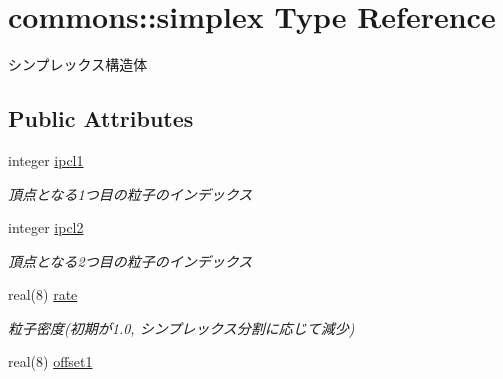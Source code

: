 \hypertarget{structcommons_1_1simplex}{\section{commons\-:\-:simplex Type Reference}
\label{structcommons_1_1simplex}
}


シンプレックス構造体  


\subsection*{Public Attributes}
\begin{DoxyCompactItemize}
\item 
\hypertarget{structcommons_1_1simplex_ac342ada7e0a8ad8c324434b3a5763ec3}{integer \hyperlink{structcommons_1_1simplex_ac342ada7e0a8ad8c324434b3a5763ec3}{ipcl1}}\label{structcommons_1_1simplex_ac342ada7e0a8ad8c324434b3a5763ec3}

\begin{DoxyCompactList}\small\item\em 頂点となる1つ目の粒子のインデックス \end{DoxyCompactList}\item 
\hypertarget{structcommons_1_1simplex_a220193df1706ae8c3323d72c83f8ca42}{integer \hyperlink{structcommons_1_1simplex_a220193df1706ae8c3323d72c83f8ca42}{ipcl2}}\label{structcommons_1_1simplex_a220193df1706ae8c3323d72c83f8ca42}

\begin{DoxyCompactList}\small\item\em 頂点となる2つ目の粒子のインデックス \end{DoxyCompactList}\item 
\hypertarget{structcommons_1_1simplex_a9b2578ceda8bd90aa11d8b467ad96f9d}{real(8) \hyperlink{structcommons_1_1simplex_a9b2578ceda8bd90aa11d8b467ad96f9d}{rate}}\label{structcommons_1_1simplex_a9b2578ceda8bd90aa11d8b467ad96f9d}

\begin{DoxyCompactList}\small\item\em 粒子密度(初期が1.0, シンプレックス分割に応じて減少) \end{DoxyCompactList}\item 
\hypertarget{structcommons_1_1simplex_a677e0515f8ba15f36bf18f7640f915f3}{real(8) \hyperlink{structcommons_1_1simplex_a677e0515f8ba15f36bf18f7640f915f3}{offset1}}\label{structcommons_1_1simplex_a677e0515f8ba15f36bf18f7640f915f3}


\end{DoxyCompactItemize}
